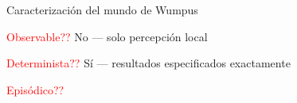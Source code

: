 \begin{frame}{Caracterización del mundo de Wumpus}
    
    \textcolor{red}{Observable??} No — solo percepción local
    \bigskip
    
    \textcolor{red}{Determinista??} Sí — resultados especificados exactamente
    \bigskip
    
    \textcolor{red}{Episódico??}
    
\end{frame}
